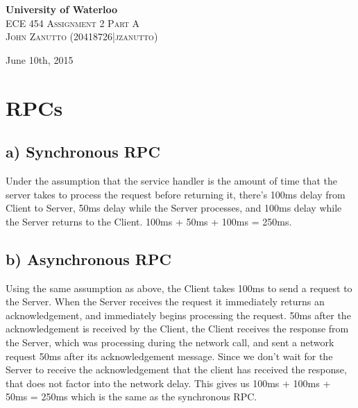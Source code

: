 \documentclass[12pt]{article}
\date{}
\begin{document}
\def\question#1{\item[\bf #1.]}
\def\part#1{\item[\bf#1)]}
\newcommand{\pc}[1]{\mbox{\textbf{#1}}} %
\newcommand{\duedate}{June 10th, 2015}
\begin{titlepage}
\vspace*{\fill}
\textbf{\LARGE University of Waterloo}\\[1.5cm]

\textsc{\Large ECE 454 Assignment 2 Part A}\\[0.5cm]

\textsc{John Zanutto (20418726|jzanutto)}

\duedate
\vspace*{\fill}
\end{titlepage}
\section{RPCs}
\subsection*{a) Synchronous RPC}
Under the assumption that the service handler is the amount of time that the server takes to process the request before returning it, there's 100ms delay from Client to Server, 50ms delay while the Server processes, and 100ms delay while the Server returns to the Client. 100ms + 50ms + 100ms = 250ms.
\subsection*{b) Asynchronous RPC}
Using the same assumption as above, the Client takes 100ms to send a request to the Server. When the Server receives the request it immediately returns an acknowledgement, and immediately begins processing the request. 50ms after the acknowledgement is received by the Client, the Client receives the response from the Server, which was processing during the network call, and sent a network request 50ms after its acknowledgement message.  Since we don't wait for the Server to receive the acknowledgement that the client has received the response, that does not factor into the network delay. This gives us 100ms + 100ms + 50ms = 250ms which is the same as the synchronous RPC.
\end{document}
